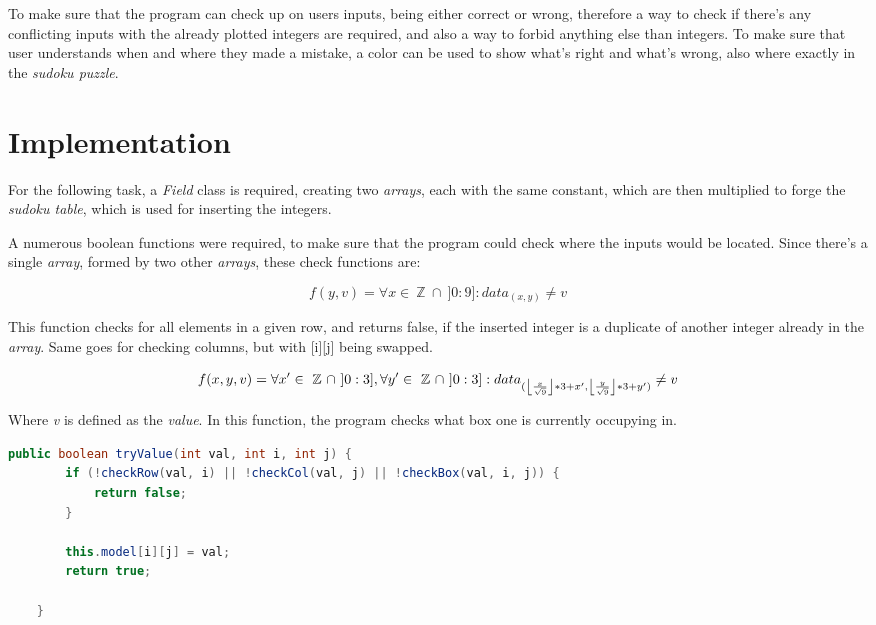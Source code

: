 \documentclass[a4paper,10pt]{article}
\DeclarePairedDelimiter\floor{\lfloor}{\rfloor}
\begin{document}
To make sure that the program can check up on users inputs, being either correct or wrong, therefore a way to check if there's any conflicting inputs with the already plotted integers are required, and also a way to forbid anything else than integers. To make sure that user understands when and where they made a mistake, a color can be used to show what's right and what's wrong, also where exactly in the \textit{sudoku puzzle}.

\newpage

\section{Implementation}
For the following task, a \textit{Field} class is required, creating two \textit{arrays}, each with the same constant, which are then multiplied to forge the \textit{sudoku table}, which is used for inserting the integers.

A numerous boolean functions were required, to make sure that the program could check where the inputs would be located. Since there's a single \textit{array}, formed by two other \textit{arrays}, these check functions are:

\begin{equation}
    f(y,v)=\forall x \in \ \mathbb{Z} \ \cap \ ]0:9] : data_{(x,y)} \ne v
\end{equation}

This function checks for all elements in a given row, and returns false, if the inserted integer is a duplicate of another integer already in the \textit{array}. Same goes for checking columns, but with [i][j] being swapped.

\begin{equation*}
    f(x, y, v) = \forall x' \in \ \mathbb{Z} \ \cap \ ]0:3],\forall y' \in \ \mathbb{Z} \ \cap \ ]0:3] : data_{(\floor*{\frac{x}{\sqrt{9}}}*3+x' , \floor*{\frac{y}{\sqrt{9}}}*3+y')} \ne v
\end{equation*}

Where \textit{v} is defined as the \textit{value}. In this function, the program checks what box one is currently occupying in.

\begin{lstlisting}[language=java]
public boolean tryValue(int val, int i, int j) {
        if (!checkRow(val, i) || !checkCol(val, j) || !checkBox(val, i, j)) {
            return false;
        }

        this.model[i][j] = val;
        return true;
    
    }
\end{lstlisting}
\end{document}
